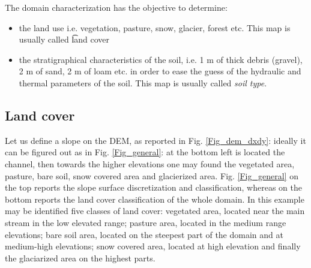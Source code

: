 The domain characterization has the objective to determine:
\begin{itemize}
\item the land use i.e. vegetation, pasture, snow, glacier, forest etc. This map is usually called {\t land cover}
\item the stratigraphical characteristics of the soil, i.e. 1 m of thick debris (gravel), 2 m of sand, 2 m of loam etc. in order to ease the guess of the hydraulic and thermal parameters of the soil. This map is usually called {\it soil type}.
\end{itemize}


\subsection{Land cover}

Let us define a slope on the DEM, as reported in Fig. \ref{Fig_dem_dxdy}: ideally it can be figured out as in Fig. \ref{Fig_general}: at the bottom left is located the channel, then towards the higher elevations one may found the vegetated area, pasture, bare soil, snow covered area and glacierized area. 
 Fig. \ref{Fig_general} on the top reports the slope surface discretization and classification, whereas on the bottom reports the land cover classification of the whole domain.
In this example may be identified five classes of land cover: vegetated area, located near the main stream in the low elevated range; pasture area, located in the medium range elevations; bare soil area, located on the steepest part of the domain and at medium-high elevations; snow covered area, located at high elevation and finally the glaciarized area on the highest parts.



